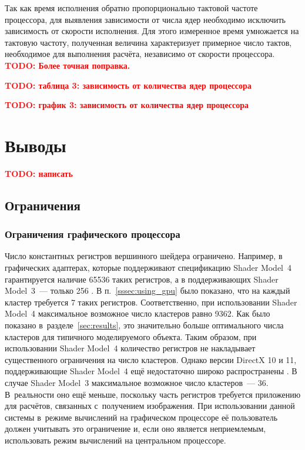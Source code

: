 \documentclass[a4paper, 14pt, titlepage]{extarticle}
\newcommand{\todo}[1]{\textbf{\textcolor{red}{TODO: #1}}}
\newcommand{\eng}[1]{{\English #1}}
\let\oldsection\section
\renewcommand{\section}{\newpage\oldsection}
\begin{document}
      Так как время исполнения обратно пропорционально тактовой частоте процессора, для выявления
      зависимости от числа ядер необходимо исключить зависимость от скорости исполнения. Для этого
      измеренное время умножается на тактовую частоту, полученная величина характеризует примерное
      число тактов, необходимое для выполнения расчёта, независимо от скорости процессора.
      \todo{Более точная поправка.}

      \todo{таблица 3: зависимость от количества ядер процессора}

      \todo{график 3: зависимость от количества ядер процессора}

  \section{Выводы}

    \todo{написать}

    \subsection{Ограничения}

      \subsubsection{Ограничения графического процессора}\label{sssec:gpu_limitations}

        Число константных регистров вершинного шейдера ограничено. Например, в графических
        адаптерах, которые поддерживают спецификацию \eng{Shader Model~4} гарантируется наличие 65536 таких регистров,
        а в поддерживающих \eng{Shader Model~3}~--- только 256 \cite{shader-models}. В п.~\ref{sssec:using_gpu} было
        показано, что на каждый кластер требуется 7 таких регистров. Соответственно, при использовании
        \eng{Shader Model~4} максимальное возможное число кластеров равно 9362. Как было показано
        в~разделе~\ref{sec:results}, это значительно больше оптимального числа кластеров для
        типичного моделируемого объекта. Таким образом, при использовании \eng{Shader Model~4}
        количество регистров не накладывает существенного ограничения на число кластеров. Однако
        версии DirectX 10 и 11, поддерживающие \eng{Shader Model~4} ещё недостаточно широко
        распространены \cite{steam-hardware}. В случае \eng{Shader Model~3} максимальное возможное число кластеров~--- 36.
        В~реальности оно ещё меньше, поскольку часть регистров требуется приложению для
        расчётов, связанных с~получением изображения. При использовании данной системы в~режиме
        вычислений на графическом процессоре её пользователь должен учитывать это ограничение и,
        если оно является неприемлемым, использовать режим вычислений на центральном процессоре.
\end{document}
